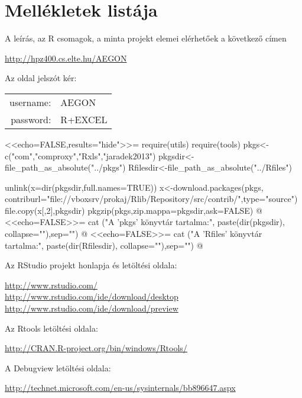 
\chapter{Mellékletek listája}\label{chap:11}


A leírás, az R csomagok, a minta projekt elemei elérhetőek a következő címen
\begin{center}
\url{http://hpz400.cs.elte.hu/AEGON}
\end{center}
Az oldal jelszót kér:
\begin{center}
  \ttfamily
  \begin{tabular}{rl}
    username:&AEGON\\
    password:&R+EXCEL  
  \end{tabular}
\end{center}
\begin{Rnw}
<<echo=FALSE,results="hide">>=
require(utils)
require(tools)
pkgs<-c("com","comproxy","Rxls","jaradek2013")
pkgsdir<-file_path_as_absolute("../pkgs")
Rfilesdir<-file_path_as_absolute("../Rfiles")

unlink(x=dir(pkgsdir,full.names=TRUE))
x<-download.packages(pkgs,
contriburl="file://vboxsrv/prokaj/Rlib/Repository/src/contrib/",type="source")
file.copy(x[,2],pkgsdir)
pkgzip(pkgs,zip.mappa=pkgsdir,ask=FALSE)
@
<<echo=FALSE>>=
cat ("A 'pkgs' könyvtár tartalma:",
paste(dir(pkgsdir),
collapse="\n   "),sep="\n   ")
@
<<echo=FALSE>>=
cat ("A 'Rfiles' könyvtár tartalma:",
paste(dir(Rfilesdir),
collapse="\n   "),sep="\n   ")
@  
\end{Rnw}
Az RStudio projekt honlapja és letöltési oldala:
\begin{center}
\url{http://www.rstudio.com/}\\
\url{http://www.rstudio.com/ide/download/desktop}\\
\url{http://www.rstudio.com/ide/download/preview}
\end{center}
Az Rtools letöltési oldala:
\begin{center}
  \url{http://CRAN.R-project.org/bin/windows/Rtools/}
\end{center}
A Debugview letöltési oldala:
\begin{center}
  \url{http://technet.microsoft.com/en-us/sysinternals/bb896647.aspx}
\end{center}

